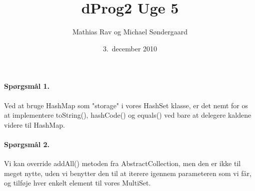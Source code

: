 \documentclass{article}
\author{Mathias Rav og Michael Søndergaard}
\title{dProg2 Uge 5}
\date{3.\ december 2010}
\begin{document}
\maketitle
\paragraph{Spørgsmål 1.}
Ved at bruge HashMap som "storage" i vores HashSet klasse, er det nemt for os
at implementere toString(), hashCode() og equals() ved bare at delegere kaldene
videre til HashMap.

\paragraph{Spørgsmål 2.}
Vi kan override addAll() metoden fra AbstractCollection, men den er ikke til meget
nytte, uden vi benytter den til at iterere igennem parameteren som vi får,
og tilføje hver enkelt element til vores MultiSet.
\end{document}
